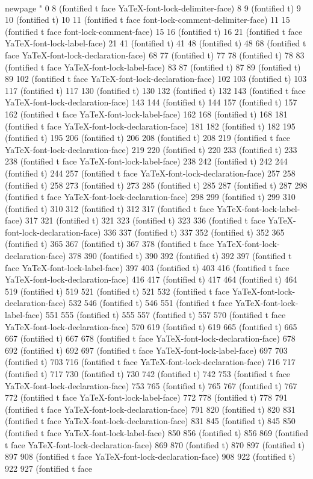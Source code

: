  \\newpage
" 0 8 (fontified t face YaTeX-font-lock-delimiter-face) 8 9 (fontified t) 9 10 (fontified t) 10 11 (fontified t face font-lock-comment-delimiter-face) 11 15 (fontified t face font-lock-comment-face) 15 16 (fontified t) 16 21 (fontified t face YaTeX-font-lock-label-face) 21 41 (fontified t) 41 48 (fontified t) 48 68 (fontified t face YaTeX-font-lock-declaration-face) 68 77 (fontified t) 77 78 (fontified t) 78 83 (fontified t face YaTeX-font-lock-label-face) 83 87 (fontified t) 87 89 (fontified t) 89 102 (fontified t face YaTeX-font-lock-declaration-face) 102 103 (fontified t) 103 117 (fontified t) 117 130 (fontified t) 130 132 (fontified t) 132 143 (fontified t face YaTeX-font-lock-declaration-face) 143 144 (fontified t) 144 157 (fontified t) 157 162 (fontified t face YaTeX-font-lock-label-face) 162 168 (fontified t) 168 181 (fontified t face YaTeX-font-lock-declaration-face) 181 182 (fontified t) 182 195 (fontified t) 195 206 (fontified t) 206 208 (fontified t) 208 219 (fontified t face YaTeX-font-lock-declaration-face) 219 220 (fontified t) 220 233 (fontified t) 233 238 (fontified t face YaTeX-font-lock-label-face) 238 242 (fontified t) 242 244 (fontified t) 244 257 (fontified t face YaTeX-font-lock-declaration-face) 257 258 (fontified t) 258 273 (fontified t) 273 285 (fontified t) 285 287 (fontified t) 287 298 (fontified t face YaTeX-font-lock-declaration-face) 298 299 (fontified t) 299 310 (fontified t) 310 312 (fontified t) 312 317 (fontified t face YaTeX-font-lock-label-face) 317 321 (fontified t) 321 323 (fontified t) 323 336 (fontified t face YaTeX-font-lock-declaration-face) 336 337 (fontified t) 337 352 (fontified t) 352 365 (fontified t) 365 367 (fontified t) 367 378 (fontified t face YaTeX-font-lock-declaration-face) 378 390 (fontified t) 390 392 (fontified t) 392 397 (fontified t face YaTeX-font-lock-label-face) 397 403 (fontified t) 403 416 (fontified t face YaTeX-font-lock-declaration-face) 416 417 (fontified t) 417 464 (fontified t) 464 519 (fontified t) 519 521 (fontified t) 521 532 (fontified t face YaTeX-font-lock-declaration-face) 532 546 (fontified t) 546 551 (fontified t face YaTeX-font-lock-label-face) 551 555 (fontified t) 555 557 (fontified t) 557 570 (fontified t face YaTeX-font-lock-declaration-face) 570 619 (fontified t) 619 665 (fontified t) 665 667 (fontified t) 667 678 (fontified t face YaTeX-font-lock-declaration-face) 678 692 (fontified t) 692 697 (fontified t face YaTeX-font-lock-label-face) 697 703 (fontified t) 703 716 (fontified t face YaTeX-font-lock-declaration-face) 716 717 (fontified t) 717 730 (fontified t) 730 742 (fontified t) 742 753 (fontified t face YaTeX-font-lock-declaration-face) 753 765 (fontified t) 765 767 (fontified t) 767 772 (fontified t face YaTeX-font-lock-label-face) 772 778 (fontified t) 778 791 (fontified t face YaTeX-font-lock-declaration-face) 791 820 (fontified t) 820 831 (fontified t face YaTeX-font-lock-declaration-face) 831 845 (fontified t) 845 850 (fontified t face YaTeX-font-lock-label-face) 850 856 (fontified t) 856 869 (fontified t face YaTeX-font-lock-declaration-face) 869 870 (fontified t) 870 897 (fontified t) 897 908 (fontified t face YaTeX-font-lock-declaration-face) 908 922 (fontified t) 922 927 (fontified t face 